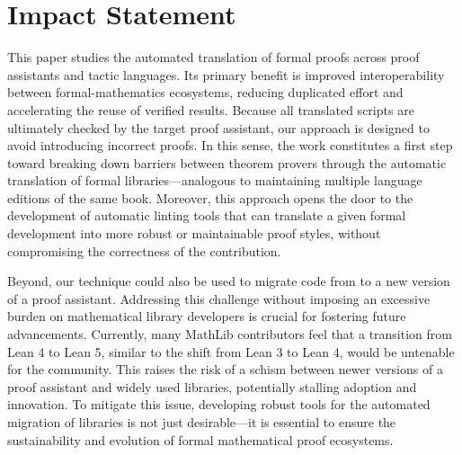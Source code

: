 \documentclass{article}
\theoremstyle{plain}
\theoremstyle{definition}
\theoremstyle{remark}
\begin{document}
	
	\section*{Impact Statement}

        
        This paper studies the automated translation of formal proofs
        across proof assistants and tactic languages. Its primary
        benefit is improved interoperability between
        formal-mathematics ecosystems, reducing duplicated effort and
        accelerating the reuse of verified results.
%
        Because all translated scripts are ultimately checked by the
        target proof assistant, our approach is designed to avoid
        introducing incorrect proofs. In this sense, the work
        constitutes a first step toward breaking down barriers between
        theorem provers through the automatic translation of formal
        libraries---analogous to maintaining multiple language editions
        of the same book.
%
        Moreover, this approach opens the door to the development of
        automatic linting tools that can translate a given formal
        development into more robust or maintainable proof styles,
        without compromising the correctness of the contribution.

        Beyond, our technique could also be used to migrate code from
        to a new version of a proof assistant. Addressing this
        challenge without imposing an excessive burden on
        mathematical library developers is crucial for fostering
        future advancements.  Currently, many MathLib contributors
        feel that a transition from Lean 4 to Lean 5, similar to the
        shift from Lean 3 to Lean 4, would be untenable for the
        community. This raises the risk of a schism between newer
        versions of a proof assistant and widely used libraries, potentially
        stalling adoption and innovation. To mitigate this issue,
        developing robust tools for the automated migration of
        libraries is not just desirable---it is essential to ensure the
        sustainability and evolution of formal mathematical proof
        ecosystems.
        
	
	
\end{document}
